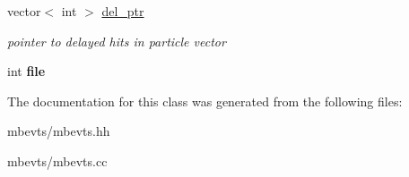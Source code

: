 \begin{DoxyCompactItemize}
\mbox{\label{classmbevts_ac5f29344cdf6ba222e9ccd437542ca16}} 
vector$<$ int $>$ \hyperlink{classmbevts_ac5f29344cdf6ba222e9ccd437542ca16}{del\+\_\+ptr}
\begin{DoxyCompactList}\small\item\em pointer to delayed hits in particle vector \end{DoxyCompactList}\item 
\mbox{\label{classmbevts_ab0eb943464d109e2218004991e175938}} 
int {\bfseries file}
\end{DoxyCompactItemize}


The documentation for this class was generated from the following files\+:\begin{DoxyCompactItemize}
\item 
mbevts/mbevts.\+hh\item 
mbevts/mbevts.\+cc\end{DoxyCompactItemize}
